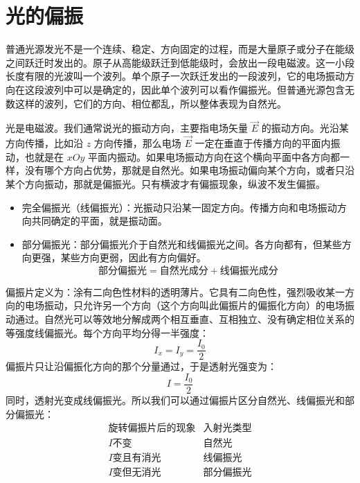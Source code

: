 


\chapter{光的偏振}

\begin{definition}
普通光源发光不是一个连续、稳定、方向固定的过程，而是大量原子或分子在能级之间跃迁时发出的。原子从高能级跃迁到低能级时，会放出一段电磁波。这一小段长度有限的光波叫一个波列。单个原子一次跃迁发出的一段波列，它的电场振动方向在这段波列中可以是确定的，因此单个波列可以看作偏振光。但普通光源包含无数这样的波列，它们的方向、相位都乱，所以整体表现为自然光。
\end{definition}

\begin{definition}[偏振（Polarization）]
    光是电磁波。我们通常说光的振动方向，主要指电场矢量 \(\vec E\) 的振动方向。光沿某方向传播，比如沿 \(z\) 方向传播，那么电场 \(\vec E\) 一定在垂直于传播方向的平面内振动，也就是在 \(xOy\) 平面内振动。如果电场振动方向在这个横向平面中各方向都一样，没有哪个方向占优势，那就是自然光。如果电场振动偏向某个方向，或者只沿某个方向振动，那就是偏振光。只有横波才有偏振现象，纵波不发生偏振。
    \begin{itemize}
    \item 完全偏振光（线偏振光）：光振动只沿某一固定方向。传播方向和电场振动方向共同确定的平面，就是振动面。
    \item 部分偏振光：部分偏振光介于自然光和线偏振光之间。各方向都有，但某些方向更强，某些方向更弱，因此有方向偏好。
\[
\boxed{\text{部分偏振光}=\text{自然光成分}+\text{线偏振光成分}}
\]
    \end{itemize}
\end{definition}

\begin{definition}
    偏振片定义为：涂有二向色性材料的透明薄片。它具有二向色性，强烈吸收某一方向的电场振动，只允许另一个方向（这个方向叫此偏振片的偏振化方向）的电场振动通过。自然光可以等效地分解成两个相互垂直、互相独立、没有确定相位关系的等强度线偏振光。每个方向平均分得一半强度：
\[
I_x=I_y=\frac{I_0}{2}
\]偏振片只让沿偏振化方向的那个分量通过，于是透射光强变为：
\[
I=\frac{I_0}{2}
\]同时，透射光变成线偏振光。所以我们可以通过偏振片区分自然光、线偏振光和部分偏振光：
\[
\begin{array}{c|c}
\text{旋转偏振片后的现象} & \text{入射光类型}\\
\hline
I\text{不变} & \text{自然光}\\
I\text{变且有消光} & \text{线偏振光}\\
I\text{变但无消光} & \text{部分偏振光}
\end{array}
\]
\end{definition}

